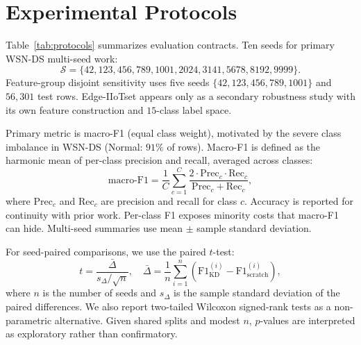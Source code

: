 \documentclass[journal]{IEEEtran}
\newcommand{\dataset}{WSN-DS}
\begin{document}
\section{Experimental Protocols}
\label{sec:protocols}

Table~\ref{tab:protocols} summarizes evaluation contracts.
Ten seeds for primary \dataset{} multi-seed work:
\[
\mathcal{S} = \{42, 123, 456, 789, 1001, 2024, 3141, 5678, 8192, 9999\}.
\]
Feature-group disjoint sensitivity uses five seeds $\{42, 123, 456, 789, 1001\}$ and $56{,}301$ test rows.
Edge-IIoTset appears only as a secondary robustness study with its own feature construction and $15$-class label space.

Primary metric is macro-F1 (equal class weight), motivated by the severe class imbalance in \dataset{} (Normal: $91\%$ of rows).
Macro-F1 is defined as the harmonic mean of per-class precision and recall, averaged across classes:
\begin{equation}
\mathrm{macro\text{-}F1} = \frac{1}{C} \sum_{c=1}^{C} \frac{2 \cdot \mathrm{Prec}_c \cdot \mathrm{Rec}_c}{\mathrm{Prec}_c + \mathrm{Rec}_c},
\end{equation}
where $\mathrm{Prec}_c$ and $\mathrm{Rec}_c$ are precision and recall for class $c$.
Accuracy is reported for continuity with prior work.
Per-class F1 exposes minority costs that macro-F1 can hide.
Multi-seed summaries use mean $\pm$ sample standard deviation.

For seed-paired comparisons, we use the paired $t$-test:
\begin{equation}
t = \frac{\bar{\Delta}}{s_{\Delta} / \sqrt{n}}, \quad \bar{\Delta} = \frac{1}{n} \sum_{i=1}^{n} (\mathrm{F1}_{\mathrm{KD}}^{(i)} - \mathrm{F1}_{\mathrm{scratch}}^{(i)}),
\end{equation}
where $n$ is the number of seeds and $s_{\Delta}$ is the sample standard deviation of the paired differences.
We also report two-tailed Wilcoxon signed-rank tests as a non-parametric alternative.
Given shared splits and modest $n$, $p$-values are interpreted as exploratory rather than confirmatory.
\end{document}

